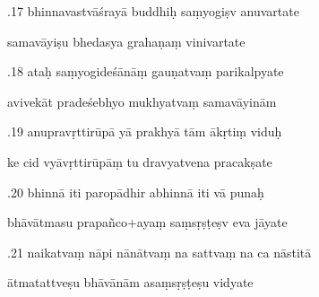 \documentclass[article,12pt,a4paper]{memoir}%
\newcounter{parCount}
\begin{document}
	  
	  \pstart {}.17 bhinnavastvāśrayā buddhiḥ saṃyogiṣv anuvartate 
	{}
	\pend%
      

	  
	  \pstart \leavevmode%
	samavāyiṣu bhedasya grahaṇaṃ vinivartate 
	{}
	\pend%
      

	  
	  \pstart {}.18 ataḥ saṃyogideśānāṃ gauṇatvaṃ parikalpyate 
	{}
	\pend%
      

	  
	  \pstart \leavevmode%
	avivekāt pradeśebhyo mukhyatvaṃ samavāyinām 
	{}
	\pend%
      

	  
	  \pstart {}.19 anupravṛttirūpā yā prakhyā tām ākṛtiṃ viduḥ 
	{}
	\pend%
      

	  
	  \pstart \leavevmode%
	ke cid vyāvṛttirūpāṃ tu dravyatvena pracakṣate 
	{}
	\pend%
      

	  
	  \pstart {}.20 bhinnā iti paropādhir abhinnā iti vā punaḥ 
	{}
	\pend%
      

	  
	  \pstart \leavevmode%
	bhāvātmasu prapañco+ayaṃ saṃsṛṣṭeṣv eva jāyate 
	{}
	\pend%
      

	  
	  \pstart {}.21 naikatvaṃ nāpi nānātvaṃ na sattvaṃ na ca nāstitā 
	{}
	\pend%
      

	  
	  \pstart \leavevmode%
	ātmatattveṣu bhāvānām asaṃsṛṣṭeṣu vidyate 
	{}
	\pend%
      
\end{document}
